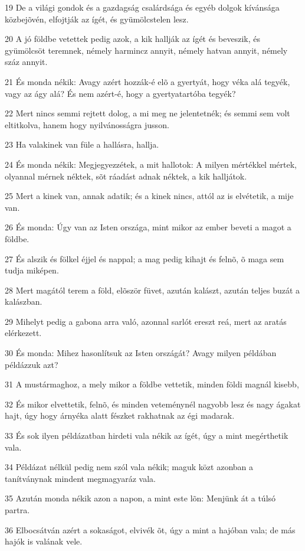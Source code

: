 \par 19 De a világi gondok és a gazdagság csalárdsága és egyéb dolgok kívánsága közbejõvén, elfojtják az ígét, és gyümölcstelen lesz.
\par 20 A jó földbe vetettek pedig azok, a kik hallják az ígét és beveszik, és gyümölcsöt teremnek, némely harmincz annyit, némely hatvan annyit, némely száz annyit.
\par 21 És monda nékik: Avagy azért hozzák-é elõ a gyertyát, hogy véka alá tegyék, vagy az ágy alá? És nem azért-é, hogy a gyertyatartóba tegyék?
\par 22 Mert nincs semmi rejtett dolog, a mi meg ne jelentetnék; és semmi sem volt eltitkolva, hanem hogy nyilvánosságra jusson.
\par 23 Ha valakinek van füle a hallásra, hallja.
\par 24 És monda nékik: Megjegyezzétek, a mit hallotok: A milyen mértékkel mértek, olyannal mérnek néktek, sõt ráadást adnak néktek, a kik halljátok.
\par 25 Mert a kinek van, annak adatik; és a kinek nincs, attól az is elvétetik, a mije van.
\par 26 És monda: Úgy van az Isten országa, mint mikor az ember beveti a magot a földbe.
\par 27 És alszik és fölkel éjjel és nappal; a mag pedig kihajt és felnõ, õ maga sem tudja miképen.
\par 28 Mert magától terem a föld, elõször füvet, azután kalászt, azután teljes buzát a kalászban.
\par 29 Mihelyt pedig a gabona arra való, azonnal sarlót ereszt reá, mert az aratás elérkezett.
\par 30 És monda: Mihez hasonlítsuk az Isten országát? Avagy milyen példában példázzuk azt?
\par 31 A mustármaghoz, a mely mikor a földbe vettetik, minden földi magnál kisebb,
\par 32 És mikor elvettetik, felnõ, és minden veteménynél nagyobb lesz és nagy ágakat hajt, úgy hogy árnyéka alatt fészket rakhatnak az égi madarak.
\par 33 És sok ilyen példázatban hirdeti vala nékik az ígét, úgy a mint megérthetik vala.
\par 34 Példázat nélkül pedig nem szól vala nékik; maguk közt azonban a tanítványnak mindent megmagyaráz vala.
\par 35 Azután monda nékik azon a napon, a mint este lõn: Menjünk át a túlsó partra.
\par 36 Elbocsátván azért a sokaságot, elvivék õt, úgy a mint a hajóban vala; de más hajók is valának vele.
